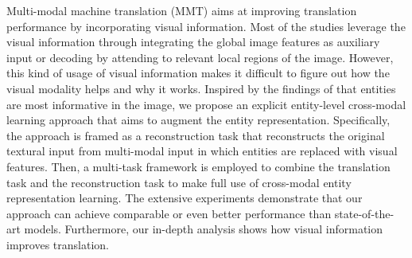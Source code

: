 Multi-modal machine translation (MMT) aims at improving translation performance by incorporating visual information. Most of the studies leverage the visual information through integrating the global image features as auxiliary input or decoding by attending to relevant local regions of the image. However, this kind of usage of visual information makes it difficult to figure out how the visual modality helps and why it works. Inspired by the findings of \cite{caglayan-etal-2019-probing} that entities are most informative in the image, we propose an explicit entity-level cross-modal learning approach that aims to augment the entity representation. Specifically, the approach is framed as a reconstruction task that reconstructs the original textural input from multi-modal input in which entities are replaced with visual features. Then, a multi-task framework is employed to combine the translation task and the reconstruction task to make full use of cross-modal entity representation learning. The extensive experiments demonstrate that our approach can achieve comparable or even better performance than state-of-the-art models. Furthermore, our in-depth analysis shows how visual information improves translation.
